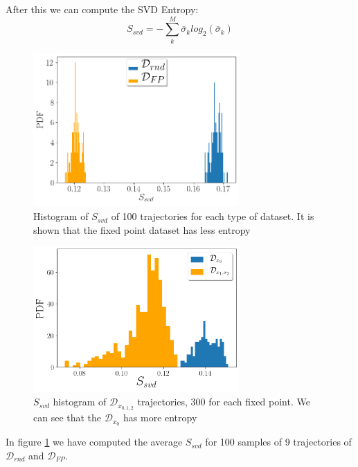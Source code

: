 \documentclass{article}
\begin{document}
After this we can compute the SVD Entropy:
\begin{equation}
    S_{svd}=-\sum^{M}_{k}\bar{\sigma}_k log_2(\bar{\sigma}_k)
\end{equation}

\begin{figure}[h]
    \centering
    \includegraphics[width=0.7\textwidth]{images/entropy_svd_fixed_vs_random.png} 
    \caption{Histogram of $S_{svd}$ of 100 trajectories for each type of dataset. It is shown that the fixed point dataset has less entropy}
    \label{fig:histogram_entropy}
\end{figure}
\begin{figure}
    \centering
    \includegraphics[width=0.7\textwidth]{images/entropy_svd_zeroVSother.png}
    \caption{$S_{svd}$ histogram of $\mathcal{D}_{x_{0,1,2}}$ trajectories, 300 for each fixed point. We can see that the $\mathcal{D}_{x_0}$ has more entropy}
    \label{fig:SVD-Entropy_statistic_012}

\end{figure}
In figure \ref{fig:histogram_entropy} we have computed the average $S_{svd}$ for 100 samples of 9 trajectories of $\mathcal{D}_{rnd}$ and $\mathcal{D}_{FP}$.
\end{document}
